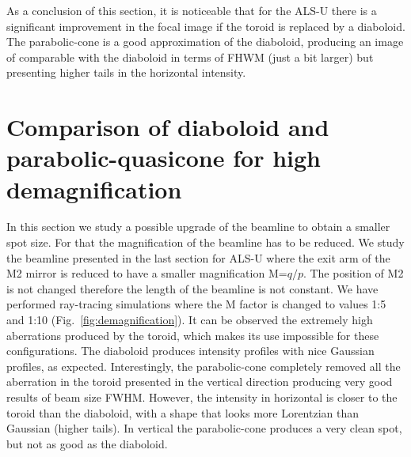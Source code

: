 \documentclass{iucr}              %
\begin{document}
As a conclusion of this section, it is noticeable that for the ALS-U there is a significant improvement in the focal image if the toroid is replaced by a diaboloid. The parabolic-cone is a good approximation of the diaboloid, producing an image of comparable with the diaboloid in terms of FHWM (just a bit larger) but presenting higher tails in the horizontal intensity. 

\section{Comparison of diaboloid and parabolic-quasicone for high demagnification}
\label{sec:scan}

In this section we study a possible upgrade of the beamline to obtain a smaller spot size. For that the magnification of the beamline has to be reduced. We study the beamline presented in the last section for ALS-U where the exit arm of the M2 mirror is reduced to have a smaller magnification M=$q/p$. The position of M2 is not changed therefore the length of the beamline is not constant. We have performed ray-tracing simulations where the M factor is changed to values 1:5 and 1:10 (Fig.~\ref{fig:demagnification}). It can be observed the extremely high aberrations produced by the toroid, which makes its use impossible for these configurations. The diaboloid produces intensity profiles with nice Gaussian profiles, as expected. Interestingly, the parabolic-cone completely removed all the aberration in the toroid presented in the vertical direction producing very good results of beam size FWHM. However, the intensity in horizontal is closer to the toroid than the diaboloid, with a shape that looks more Lorentzian than Gaussian (higher tails). In vertical the parabolic-cone produces a very clean spot, but not as good as the diaboloid. 
\end{document}
